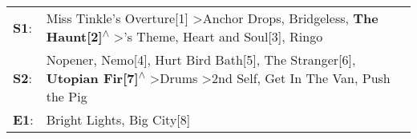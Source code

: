\begin{supertabular}{p{0.03\textwidth}p{0.92\textwidth}}
 \textbf{S1}:  &                                                                    Miss Tinkle's Overture[1]\textsuperscript{} \textgreater \enspace Anchor Drops\textsuperscript{}, \enspace Bridgeless\textsuperscript{}, \enspace \textbf{The Haunt[2]\textsuperscript{$\wedge$}} \textgreater {}'s Theme\textsuperscript{}, \enspace Heart and Soul[3]\textsuperscript{}, \enspace Ringo\textsuperscript{}  \enspace  \\
 \textbf{S2}:  &  Nopener\textsuperscript{}, \enspace Nemo[4]\textsuperscript{}, \enspace Hurt Bird Bath[5]\textsuperscript{}, \enspace The Stranger[6]\textsuperscript{}, \enspace \textbf{Utopian Fir[7]\textsuperscript{$\wedge$}} \textgreater \enspace Drums\textsuperscript{} \textgreater \enspace 2nd Self\textsuperscript{}, \enspace Get In The Van\textsuperscript{}, \enspace Push the Pig\textsuperscript{}  \enspace  \\
 \textbf{E1}:  &                                                                                                                                                                                                                                                                                                                                                            Bright Lights, Big City[8]\textsuperscript{}  \enspace  \\
\end{supertabular}
